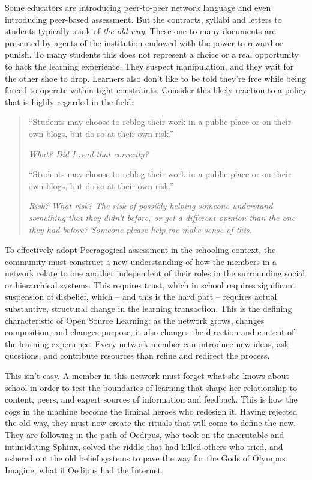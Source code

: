 Some educators are introducing peer-to-peer network language and even
introducing peer-based assessment. But the contracts, syllabi and
letters to students typically stink of \emph{the old way}. These
one-to-many documents are presented by agents of the institution endowed
with the power to reward or punish. To many students this does not
represent a choice or a real opportunity to hack the learning
experience. They suspect manipulation, and they wait for the other shoe
to drop. Learners also don't like to be told they're free while being
forced to operate within tight constraints. Consider this likely
reaction to a policy that is highly regarded in the field:

\begin{quote}
``Students may choose to reblog their work in a public place or on
  their own blogs, but do so at their own risk.'' 

\emph{What? Did I read that correctly?}

  ``Students may choose to reblog their work in a public place or on
  their own blogs, but do so at their own risk.''

   \emph{Risk? What risk? The risk of possibly helping someone
     understand something that they didn't before, or get a different
     opinion than the one they had before? Someone please help me make
     sense of this.}
\end{quote}
To effectively adopt Peeragogical assessment in the schooling context,
the community must construct a new understanding of how the members in a
network relate to one another independent of their roles in the
surrounding social or hierarchical systems. This requires trust, which
in school requires significant suspension of disbelief, which -- and
this is the hard part -- requires actual substantive, structural change
in the learning transaction. This is the defining characteristic of Open
Source Learning: as the network grows, changes composition, and changes
purpose, it also changes the direction and content of the learning
experience. Every network member can introduce new ideas, ask questions,
and contribute resources than refine and redirect the process.

This isn't easy. A member in this network must forget what she knows
about school in order to test the boundaries of learning that shape her
relationship to content, peers, and expert sources of information and
feedback. This is how the cogs in the machine become the liminal heroes
who redesign it. Having rejected the old way, they must now create the
rituals that will come to define the new. They are following in the path
of Oedipus, who took on the inscrutable and intimidating Sphinx, solved
the riddle that had killed others who tried, and ushered out the old
belief systems to pave the way for the Gods of Olympus. Imagine, what
if Oedipus had the Internet.

\label{sphinx-end}
